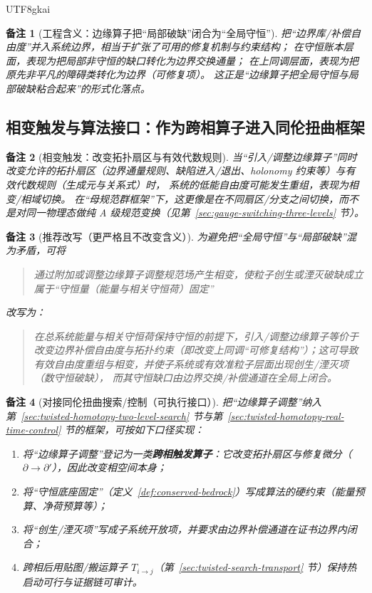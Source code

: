 \documentclass[12pt]{article}
\newtheorem{remark}{备注}[section]
\begin{document}
\begin{CJK*}{UTF8}{gkai}
\begin{remark}[工程含义：边缘算子把“局部破缺”闭合为“全局守恒”]
把“边界库/补偿自由度”并入系统边界，相当于扩张了可用的修复机制与约束结构；
在守恒账本层面，表现为把局部非守恒的缺口转化为边界交换通量；
在上同调层面，表现为把原先非平凡的障碍类转化为边界（可修复项）。
这正是“边缘算子把全局守恒与局部破缺粘合起来”的形式化落点。
\end{remark}

\subsection{相变触发与算法接口：作为跨相算子进入同伦扭曲框架}
\label{sec:edge-trigger-phase-change-and-algorithm-interface}

\begin{remark}[相变触发：改变拓扑扇区与有效代数规则]
当“引入/调整边缘算子”同时改变允许的拓扑扇区（边界通量规则、缺陷进入/退出、holonomy 约束等）与有效代数规则（生成元与关系式）时，
系统的低能自由度可能发生重组，表现为相变/相域切换。
在“母规范群框架”下，这更像是在不同扇区/分支之间切换，而不是对同一物理态做纯 A 级规范变换（见第~\ref{sec:gauge-switching-three-levels} 节）。
\end{remark}

\begin{remark}[推荐改写（更严格且不改变含义）]
为避免把“全局守恒”与“局部破缺”混为矛盾，可将
\begin{quote}
通过附加或调整边缘算子调整规范场产生相变，使粒子创生或湮灭破缺成立属于“守恒量（能量与相关守恒荷）固定”
\end{quote}
改写为：
\begin{quote}
在总系统能量与相关守恒荷保持守恒的前提下，引入/调整边缘算子等价于改变边界补偿自由度与拓扑约束（即改变上同调“可修复结构”）；这可导致有效自由度重组与相变，并使子系统或有效准粒子层面出现创生/湮灭项（数守恒破缺），
  而其守恒缺口由边界交换/补偿通道在全局上闭合。
\end{quote}
\end{remark}

\begin{remark}[对接同伦扭曲搜索/控制（可执行接口）]
把“边缘算子调整”纳入第~\ref{sec:twisted-homotopy-two-level-search} 节与第~\ref{sec:twisted-homotopy-real-time-control} 节的框架，可按如下口径实现：
\begin{enumerate}
  \item 将“边缘算子调整”登记为一类\textbf{跨相触发算子}：它改变拓扑扇区与修复微分（$\partial\to\partial'$），因此改变相空间本身；
  \item 将“守恒底座固定”（定义~\ref{def:conserved-bedrock}）写成算法的硬约束（能量预算、净荷预算等）；
  \item 将“创生/湮灭项”写成子系统开放项，并要求由边界补偿通道在证书边界内闭合；
  \item 跨相后用贴图/搬运算子 $T_{i\to j}$（第~\ref{sec:twisted-search-transport} 节）保持热启动可行与证据链可审计。
\end{enumerate}
\end{remark}


\end{CJK*}
\end{document}
